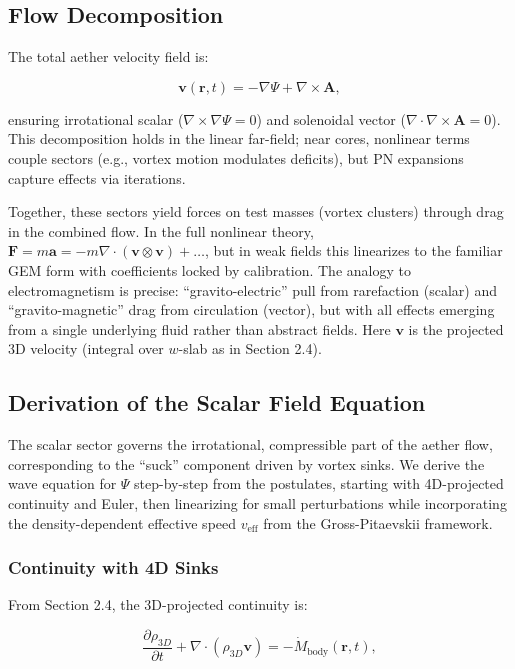 \documentclass{article}
\begin{document}
\subsection{Flow Decomposition}

The total aether velocity field is:

\[
\mathbf{v}(\mathbf{r}, t) = -\nabla \Psi + \nabla \times \mathbf{A},
\]

ensuring irrotational scalar ($\nabla \times \nabla \Psi = 0$) and solenoidal vector ($\nabla \cdot \nabla \times \mathbf{A} = 0$). This decomposition holds in the linear far-field; near cores, nonlinear terms couple sectors (e.g., vortex motion modulates deficits), but PN expansions capture effects via iterations.

Together, these sectors yield forces on test masses (vortex clusters) through drag in the combined flow. In the full nonlinear theory, $\mathbf{F} = m \mathbf{a} = -m \nabla \cdot (\mathbf{v} \otimes \mathbf{v}) + \dots$, but in weak fields this linearizes to the familiar GEM form with coefficients locked by calibration. The analogy to electromagnetism is precise: ``gravito-electric'' pull from rarefaction (scalar) and ``gravito-magnetic'' drag from circulation (vector), but with all effects emerging from a single underlying fluid rather than abstract fields. Here $\mathbf{v}$ is the projected 3D velocity (integral over $w$-slab as in Section 2.4).

\subsection{Derivation of the Scalar Field Equation}

The scalar sector governs the irrotational, compressible part of the aether flow, corresponding to the ``suck'' component driven by vortex sinks. We derive the wave equation for $\Psi$ step-by-step from the postulates, starting with 4D-projected continuity and Euler, then linearizing for small perturbations while incorporating the density-dependent effective speed $v_{\text{eff}}$ from the Gross-Pitaevskii framework.

\subsubsection{Continuity with 4D Sinks}

From Section 2.4, the 3D-projected continuity is:

\[
\frac{\partial \rho_{3D}}{\partial t} + \nabla \cdot (\rho_{3D} \mathbf{v}) = -\dot{M}_{\text{body}}(\mathbf{r}, t),
\]
\end{document}
